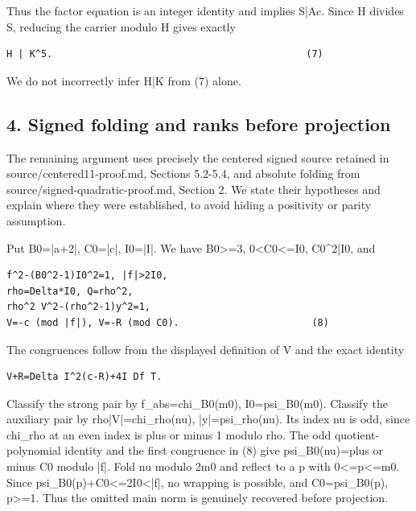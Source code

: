 Thus the factor equation is an integer identity and implies S|Ac. Since H divides S, reducing the carrier modulo H gives exactly



\begin{verbatim}
H | K^5.                                            (7)
\end{verbatim}

We do not incorrectly infer H|K from (7) alone.



\subsection*{4. Signed folding and ranks before projection}



The remaining argument uses precisely the centered signed source retained in source/\allowbreak{}centered11-proof.md, Sections 5.2-5.4, and absolute folding from source/\allowbreak{}signed-quadratic-proof.md, Section 2. We state their hypotheses and explain where they were established, to avoid hiding a positivity or parity assumption.



Put B0=\allowbreak{}|a+\allowbreak{}2|, C0=\allowbreak{}|c|, I0=\allowbreak{}|I|. We have B0\textgreater{}\allowbreak{}=\allowbreak{}3, 0\textless{}\allowbreak{}C0\textless{}\allowbreak{}=\allowbreak{}I0, C0\textasciicircum{}\allowbreak{}2|I0, and



\begin{verbatim}
f^2-(B0^2-1)I0^2=1, |f|>2I0,
rho=Delta*I0, Q=rho^2,
rho^2 V^2-(rho^2-1)y^2=1,
V=-c (mod |f|), V=-R (mod C0).                       (8)
\end{verbatim}

The congruences follow from the displayed definition of V and the exact identity



\begin{verbatim}
V+R=Delta I^2(c-R)+4I Df T.
\end{verbatim}

Classify the strong pair by f\_\allowbreak{}abs=\allowbreak{}chi\_\allowbreak{}B0(m0), I0=\allowbreak{}psi\_\allowbreak{}B0(m0). Classify the auxiliary pair by rho|V|=\allowbreak{}chi\_\allowbreak{}rho(nu), |y|=\allowbreak{}psi\_\allowbreak{}rho(nu). Its index nu is odd, since chi\_\allowbreak{}rho at an even index is plus or minus 1 modulo rho. The odd quotient-polynomial identity and the first congruence in (8) give psi\_\allowbreak{}B0(nu)=\allowbreak{}plus or minus C0 modulo |f|. Fold nu modulo 2m0 and reflect to a p with 0\textless{}\allowbreak{}=\allowbreak{}p\textless{}\allowbreak{}=\allowbreak{}m0. Since psi\_\allowbreak{}B0(p)+\allowbreak{}C0\textless{}\allowbreak{}=\allowbreak{}2I0\textless{}\allowbreak{}|f|, no wrapping is possible, and C0=\allowbreak{}psi\_\allowbreak{}B0(p), p\textgreater{}\allowbreak{}=\allowbreak{}1. Thus the omitted main norm is genuinely recovered before projection.



